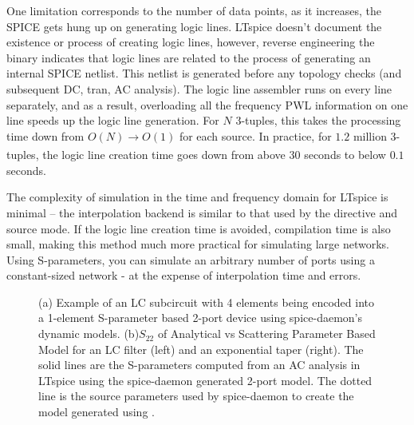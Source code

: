 One limitation corresponds to the number of data points, as it increases, the SPICE
gets hung up on generating logic lines. LTspice doesn't document the existence or process
of creating logic lines, however, reverse engineering the binary indicates that logic lines
are related to the process of generating an internal SPICE netlist. This netlist is generated
before any topology checks (and subsequent DC, tran, AC analysis). The logic line assembler runs
on every line separately, and as a result, overloading all the frequency PWL information on
one line speeds up the logic line generation. For $N$ 3-tuples, this takes the processing time
down from $O(N)\xrightarrow[]{} O(1)$ for each source. In practice, for $1.2$ million 3-tuples,
the logic line creation time goes down from above $30$ seconds to below $0.1$ seconds.

The complexity of simulation in the time and frequency domain for LTspice is minimal -- the 
interpolation backend is similar to that used by the  directive and  source mode.
If the logic line creation time is avoided, compilation time is also small, making this method
much more practical for simulating large networks. Using S-parameters, you can simulate an arbitrary
number of ports using a constant-sized network - at the expense of interpolation time and errors. 

\begin{figure}
    \centering

    
    \caption{(a) Example of an LC subcircuit with 4 elements being encoded into a 1-element
    S-parameter based 2-port device using spice-daemon's dynamic models.
    (b)$S_{22}$ of Analytical vs Scattering Parameter Based Model
    for an LC filter (left) and an exponential taper (right). The solid lines are the S-parameters
    computed from an AC analysis in LTspice using the spice-daemon generated 2-port model. The 
    dotted line is the source parameters used by spice-daemon to create the model generated
    using .}
\end{figure}

